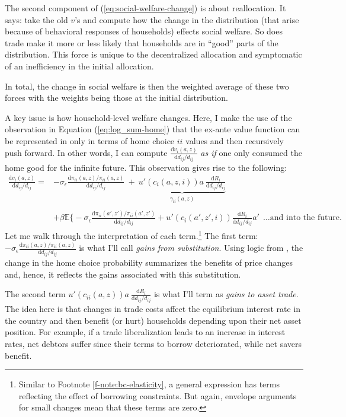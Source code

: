 \documentclass[12pt,pdftex]{article}
\begin{document}
\begin{onehalfspacing}
The second component of (\ref{eq:social-welfare-change}) is about reallocation. It says: take the old $v$'s and compute how the change in the distribution (that arise because of behavioral responses of households) effects social welfare. So does trade make it more or less likely that households are in ``good'' parts of the distribution. This force is unique to the decentralized allocation and symptomatic of an inefficiency in the initial allocation.

In total, the change in social welfare is then the weighted average of these two forces with the weights being those at the initial distribution.

A key issue is how household-level welfare changes. Here, I make the use of the observation in Equation (\ref{eq:log_sum-home}) that the ex-ante value function can be represented in only in terms of home choice $ii$ values and then recursively push forward. In other words, I can compute $\frac{\mathrm{d} v_i(a, z)}{\mathrm{d} d_{ij} / d_{ij}}$ \emph{as if} one only consumed the home good for the infinite future. This observation gives rise to the following:
\begin{align}
\frac{\mathrm{d} v_i(a, z)}{\mathrm{d} d_{ij} / d_{ij}} =& -\sigma_{\epsilon} \frac{\mathrm{d} \pi_{ii}(a,z) / \pi_{ii}(a,z)}{\mathrm{d}d_{ij} / d_{ij}} \ + \ \underbrace{u'(c_{i}(a,z,i))a \ \frac{\mathrm{d} R_{i}}{\mathrm{d} d_{ij} / d_{ij}}}_{\gamma_{ii}(a,z)} \\
\nonumber \\
& + \beta \mathbb{E} \bigg \{ -\sigma_{\epsilon} \frac{\mathrm{d} \pi_{ii}(a',z') / \pi_{ii}(a',z')}{\mathrm{d}d_{ij} / d_{ij}} +  u'(c_{i}(a',z',i))\frac{\mathrm{d} R_{i}}{\mathrm{d} d_{ij} / d_{ij}}a' \ \  \ldots \mbox{and into the future.} \nonumber
\end{align}
Let me walk through the interpretation of each term.\footnote{Similar to Footnote \ref{f-note:bc-elasticity}, a general expression has terms reflecting the effect of borrowing constraints. But again, envelope arguments for small changes mean that these terms are zero.} The first term: $-\sigma_{\epsilon} \frac{\mathrm{d} \pi_{ii}(a,z) / \pi_{ii}(a,z)}{\mathrm{d}d_{ij} / d_{ij}}$ is what I'll call \emph{gains from substitution}. Using logic from \citet{arkolakis2012new}, the change in the home choice probability summarizes the benefits of price changes and, hence, it reflects the gains associated with this substitution.

The second term $u'(c_{ii}(a,z))a \ \frac{\mathrm{d} R_{i}}{\mathrm{d} d_{ij} / d_{ij}}$ is what I'll term as \emph{gains to asset trade}. The idea here is that changes in trade costs affect the equilibrium interest rate in the country and then benefit (or hurt) households depending upon their net asset position.  For example, if a trade liberalization leads to an increase in interest rates, net debtors suffer since their terms to borrow deteriorated, while net savers benefit.


\end{onehalfspacing}
\end{document}
